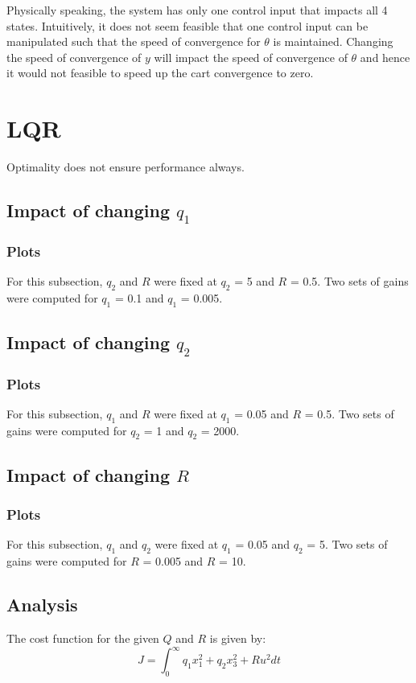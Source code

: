 \documentclass[10pt]{article}
\begin{document}
Physically speaking, the system has only one control input that impacts all 4 states. Intuitively, it does not seem feasible that one control input can be manipulated such that the speed of convergence for $\theta$ is maintained. Changing the speed of convergence of $y$ will impact the speed of convergence of $\theta$ and hence it would not feasible to speed up the cart convergence to zero.

\section{LQR}
Optimality does not ensure performance always.

\subsection{Impact of changing \texorpdfstring{$q_1$}{q1}}
\subsubsection{Plots}
For this subsection, $q_2$ and $R$ were fixed at $q_2$ = 5 and $R$ = 0.5. Two sets of gains were computed for $q_1$ = 0.1 and $q_1$ = 0.005.

\subsection{Impact of changing \texorpdfstring{$q_2$}{q2}}

\subsubsection{Plots}
For this subsection, $q_1$ and $R$ were fixed at $q_1$ = 0.05 and $R$ = 0.5. Two sets of gains were computed for $q_2$ = 1 and $q_2$ = 2000.

\subsection{Impact of changing \texorpdfstring{$R$}{R}}

\subsubsection{Plots}
For this subsection, $q_1$ and $q_2$ were fixed at $q_1$ = 0.05 and $q_2$ = 5. Two sets of gains were computed for $R$ = 0.005 and $R$ = 10.

\subsection{Analysis}
The cost function for the given $Q$ and $R$ is given by:
\begin{equation}
    J = \int_{0}^{\infty} q_1x_1^2 + q_2x_3^2 + Ru^2 dt
\end{equation}
\end{document}
